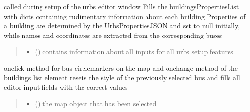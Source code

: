\documentclass[letterpaper,10pt,english]{sphinxmanual}
\begin{document}
\begin{fulllineitems}
\label{\detokenize{docs_gui/js_api/urbs_editor/buildings_editor:prepareBuildingsObject}}
\pysigstartsignatures
{}
\pysigstopsignatures
\sphinxAtStartPar
called during setup of the urbs editor window
Fills the buildingsPropertiesList with dicts containing rudimentary information about each building
Properties of a building are determined by the UrbsPropertiesJSON and set to null initially, while names and coordinates are extracted from the corresponding buses
\begin{quote}\begin{description}
\begin{itemize}
\item {} 
\sphinxAtStartPar
{} () \textendash{} contains information about all inputs for all urbs setup features

\end{itemize}

\end{description}\end{quote}

\end{fulllineitems}


\begin{fulllineitems}
\label{\detokenize{docs_gui/js_api/urbs_editor/buildings_editor:fillSelectedFeatureBuildingEditor}}
\pysigstartsignatures
{}
\pysigstopsignatures
\sphinxAtStartPar
onclick method for bus circlemarkers on the map and onchange method of the buildings list element
resets the style of the previously selected bus and fills all editor input fields with the correct values
\begin{quote}\begin{description}
\begin{itemize}
\item {} 
\sphinxAtStartPar
{} () \textendash{} the map object that has been selected

\end{itemize}

\end{description}\end{quote}

\end{fulllineitems}
\end{document}

